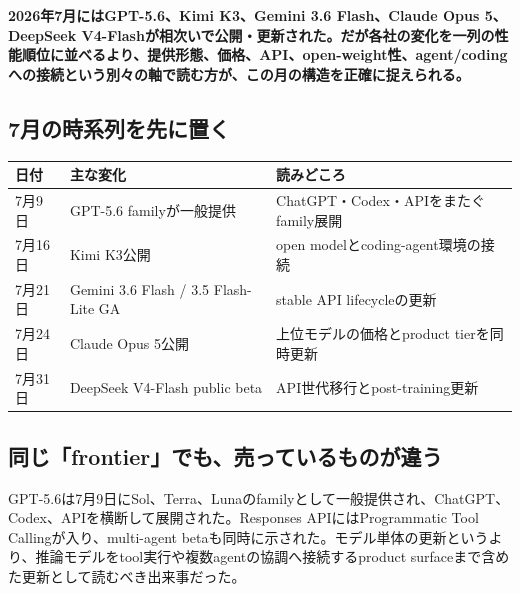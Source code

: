 \noindent\textbf{2026年7月にはGPT-5.6、Kimi K3、Gemini 3.6 Flash、Claude Opus 5、DeepSeek V4-Flashが相次いで公開・更新された。だが各社の変化を一列の性能順位に並べるより、提供形態、価格、API、open-weight性、agent/codingへの接続という別々の軸で読む方が、この月の構造を正確に捉えられる。}\autocite{src-9191d43918fc,src-a24fd97eb3d0,src-e19fbb75eb44,src-e547d0d8cbe3,src-f6aa679babd7}

\par\medskip{}
\subsection{7月の時系列を先に置く}

\begin{center}
\small
\begin{tabularx}{\columnwidth}{>{\raggedright\arraybackslash}X|>{\raggedright\arraybackslash}X|>{\raggedright\arraybackslash}X}
\toprule
\textbf{日付} & \textbf{主な変化} & \textbf{読みどころ} \\
\midrule
7月9日 & GPT-5.6 familyが一般提供 & ChatGPT・Codex・APIをまたぐfamily展開 \\
7月16日 & Kimi K3公開 & open modelとcoding-agent環境の接続 \\
7月21日 & Gemini 3.6 Flash / 3.5 Flash-Lite GA & stable API lifecycleの更新 \\
7月24日 & Claude Opus 5公開 & 上位モデルの価格とproduct tierを同時更新 \\
7月31日 & DeepSeek V4-Flash public beta & API世代移行とpost-training更新 \\
\bottomrule
\end{tabularx}
\autocite{src-9191d43918fc,src-a24fd97eb3d0,src-e19fbb75eb44,src-e547d0d8cbe3,src-f6aa679babd7}
\end{center}

\par\medskip{}
\subsection{同じ「frontier」でも、売っているものが違う}

GPT-5.6は7月9日にSol、Terra、Lunaのfamilyとして一般提供され、ChatGPT、Codex、APIを横断して展開された。Responses APIにはProgrammatic Tool Callingが入り、multi-agent betaも同時に示された。モデル単体の更新というより、推論モデルをtool実行や複数agentの協調へ接続するproduct surfaceまで含めた更新として読むべき出来事だった。\autocite{src-e19fbb75eb44}


